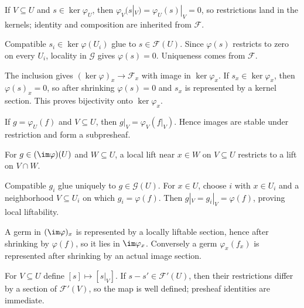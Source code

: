 \begin{solution}[Exercise 1]
If $V\subseteq U$ and $s\in\ker\varphi_U$, then $\varphi_V(s|_V)=\varphi_U(s)|_V=0$, so restrictions land in the kernels; identity and composition are inherited from $\mathcal F$.
\end{solution}

\begin{solution}[Exercise 2]
Compatible $s_i\in\ker\varphi(U_i)$ glue to $s\in\mathcal F(U)$. Since $\varphi(s)$ restricts to zero on every $U_i$, locality in $\mathcal G$ gives $\varphi(s)=0$. Uniqueness comes from $\mathcal F$.
\end{solution}

\begin{solution}[Exercise 3]
The inclusion gives $(\ker\varphi)_x\to\mathcal F_x$ with image in $\ker\varphi_x$. If $s_x\in\ker\varphi_x$, then $\varphi(s)_x=0$, so after shrinking $\varphi(s)=0$ and $s_x$ is represented by a kernel section. This proves bijectivity onto $\ker\varphi_x$.
\end{solution}

\begin{solution}[Exercise 4]
If $g=\varphi_U(f)$ and $V\subseteq U$, then $g|_V=\varphi_V(f|_V)$. Hence images are stable under restriction and form a subpresheaf.
\end{solution}

\begin{solution}[Exercise 5]
For $g\in(\im\varphi)(U)$ and $W\subseteq U$, a local lift near $x\in W$ on $V\subseteq U$ restricts to a lift on $V\cap W$.
\end{solution}

\begin{solution}[Exercise 6]
Compatible $g_i$ glue uniquely to $g\in\mathcal G(U)$. For $x\in U$, choose $i$ with $x\in U_i$ and a neighborhood $V\subseteq U_i$ on which $g_i=\varphi(f)$. Then $g|_V=g_i|_V=\varphi(f)$, proving local liftability.
\end{solution}

\begin{solution}[Exercise 7]
A germ in $(\im\varphi)_x$ is represented by a locally liftable section, hence after shrinking by $\varphi(f)$, so it lies in $\im\varphi_x$. Conversely a germ $\varphi_x(f_x)$ is represented after shrinking by an actual image section.
\end{solution}

\begin{solution}[Exercise 8]
For $V\subseteq U$ define $[s]\mapsto[s|_V]$. If $s-s'\in\mathcal F'(U)$, then their restrictions differ by a section of $\mathcal F'(V)$, so the map is well defined; presheaf identities are immediate.
\end{solution}

